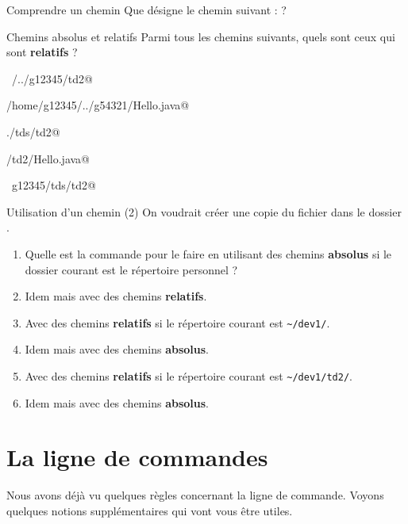 \documentclass[a4paper,11pt]{style-esi/td}
\begin{document}
		\begin{Exercice}{Comprendre un chemin}
			Que désigne le chemin suivant :
			 ?
		\end{Exercice}

		\begin{Exercice}{Chemins absolus et relatifs}
			Parmi tous les chemins suivants, quels sont ceux qui sont 
			\textbf{relatifs} ?			
			\begin{selectmany} 
			\item \verb@~/../g12345/td2@
			\item \verb@/home/g12345/../g54321/Hello.java@
			\item \verb@./tds/td2@
			\item \verb@tds/td2/Hello.java@
			\item \verb@~g12345/tds/td2@
			\end{selectmany} 
        \end{Exercice}

		\begin{Exercice}{Utilisation d'un chemin (2)}
			On voudrait créer une copie du fichier 
			dans le dossier .
			\begin{enumerate}
			\item 
				Quelle est la commande pour le faire en utilisant
				des chemins \textbf{absolus} si le dossier courant
				est le répertoire personnel ?
				\textbox{2em}
			\item 
				Idem mais avec des chemins \textbf{relatifs}.
				\textbox{2em}
			\item 
				Avec des chemins \textbf{relatifs}
				si le répertoire courant est \verb|~/dev1/|.
				\textbox{2em}
			\item 
				Idem mais avec des chemins \textbf{absolus}.
				\textbox{2em}
			\item 
				Avec des chemins \textbf{relatifs}
				si le répertoire courant est \verb|~/dev1/td2/|.
				\textbox{2em}
			\item 
				Idem mais avec des chemins \textbf{absolus}.
				\textbox{2em}
		\end{enumerate}
		\end{Exercice}

\section{La ligne de commandes}

	Nous avons déjà vu quelques règles concernant la ligne de commande.
	Voyons quelques notions supplémentaires qui vont vous être utiles.
\end{document}
